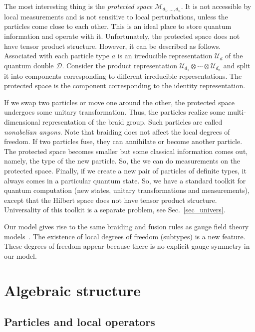 \documentclass[12pt]{article}
\newcommand{\calD}{\mathcal{D}}
\newcommand{\calM}{\mathcal{M}}
\newcommand{\calU}{\mathcal{U}}
\begin{document}
The most interesting thing is the \emph{protected space} 
$\calM_{d_1,\ldots,d_n}$. It is not accessible by local measurements and 
is not sensitive to local perturbations, unless the particles come close to 
each other. This is an ideal place to store quantum information and operate 
with it. Unfortunately, the protected space does not have tensor product 
structure. However, it can be described as follows. Associated with each 
particle type $a$ is an irreducible representation $\calU_d$ of the quantum 
double $\calD$. Consider the product representation 
$\calU_{d_1}\otimes\cdots\otimes\calU_{d_n}$ and split it into components 
corresponding to different irreducible representations. The protected 
space is the component corresponding to the identity representation. 

If we swap two particles or move one around the other, the protected space 
undergoes some unitary transformation. Thus, the particles realize some 
multi-dimensional representation of the braid group. Such particles are 
called \emph{nonabelian anyons}. Note that braiding does not affect the local 
degrees of freedom. If two particles fuse, they can annihilate or 
become another particle. The protected space becomes smaller but some 
classical information comes out, namely, the type of the new particle. 
So, the we can do measurements on the protected space. Finally, if we 
create a new pair of particles of definite types, it always comes in a 
particular quantum state. So, we have a standard toolkit for quantum 
computation (new states, unitary transformations and measurements), except 
that the Hilbert space does not have tensor product structure. Universality 
of this toolkit is a separate problem, see Sec.~\ref{sec_univers}.

Our model gives rise to the same braiding and fusion rules as gauge field 
theory models~\cite{DPR,BDP}. The existence of local degrees of freedom 
(subtypes) is a new feature. These degrees of freedom appear because there is 
no explicit gauge symmetry in our model.

\section{Algebraic structure}

\subsection{Particles and local operators} \label{sec_locop}
\end{document}

